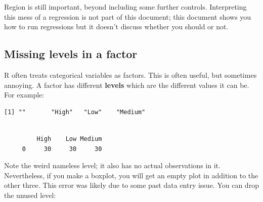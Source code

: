 \documentclass[
  letterpaper,
  DIV=11,
  numbers=noendperiod]{scrreprt}
\newenvironment{Shaded}{}{}
\newcommand{\FunctionTok}[1]{\textcolor[rgb]{0.02,0.16,0.49}{#1}}
\newcommand{\NormalTok}[1]{#1}
\newcommand{\OtherTok}[1]{\textcolor[rgb]{0.00,0.44,0.13}{#1}}
\newcommand{\SpecialCharTok}[1]{\textcolor[rgb]{0.25,0.44,0.63}{#1}}
\begin{document}
Region is still important, beyond including some further controls.
Interpreting this mess of a regression is not part of this document;
this document shows you how to run regressions but it doesn't discuss
whether you should or not.

\subsection{Missing levels in a
factor}\label{missing-levels-in-a-factor}

R often treats categorical variables as factors. This is often useful,
but sometimes annoying. A factor has different \textbf{levels} which are
the different values it can be. For example:

\begin{Shaded}
\end{Shaded}

\begin{verbatim}
[1] ""       "High"   "Low"    "Medium"
\end{verbatim}

\begin{Shaded}
\end{Shaded}

\begin{verbatim}

         High    Low Medium 
     0     30     30     30 
\end{verbatim}

Note the weird nameless level; it also has no actual observations in it.
Nevertheless, if you make a boxplot, you will get an empty plot in
addition to the other three. This error was likely due to some past data
entry issue. You can drop the unused level:

\begin{Shaded}
\end{Shaded}
\end{document}
